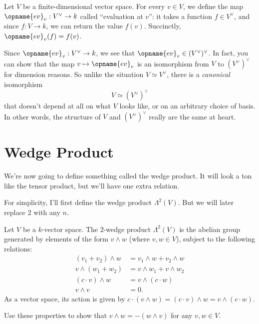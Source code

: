 \begin{itemize}
	Let $V$ be a finite-dimensional vector space.
	For every $v \in V$, we define the map $\opname{ev}_v : V^\vee \to k$
	called ``evaluation at $v$'': it takes a function $f \in V^\vee$,
	and since $f : V \to k$, we can return the value $f(v)$.
	Succinctly, $\opname{ev}_v(f) = f(v)$.

	Since $\opname{ev}_v : V^\vee \to k$, we see that
	$\opname{ev}_v \in (V^\vee)^\vee$.
	In fact, you can show that the map $v \mapsto \opname{ev}_v$
	is an isomorphism from $V$ to $(V^\vee)^\vee$ for dimension reasons.
	So unlike the situation $V \simeq V^\vee$, there
	is a \emph{canonical} isomorphism \[ V \simeq (V^\vee)^\vee \]
	that doesn't depend at all on what $V$ looks like,
	or on an arbitrary choice of basis.
	In other words, the structure of $V$ and $(V^\vee)^\vee$ really are the same at heart.
\end{itemize}



\section{Wedge Product}
We're now going to define something called the wedge product.
It will look a ton like the tensor product, but we'll have one extra relation.

For simplicity, I'll first define the wedge product $\Lambda^2(V)$.
But we will later replace $2$ with any $n$.

\begin{definition}
	Let $V$ be a $k$-vector space.
	The $2$-wedge product $\Lambda^2(V)$ is the abelian group
	generated by elements of the form $v \wedge w$ (where $v,w \in V$),
	subject to the following relations:
	\begin{align*}
		(v_1 + v_2) \wedge w &= v_1 \wedge w + v_2 \wedge w \\
		v \wedge (w_1 + w_2) &= v \wedge w_1 + v \wedge w_2 \\
		(c \cdot v) \wedge w &= v \wedge (c \cdot w) \\
		v \wedge v &= 0.
	\end{align*}
	As a vector space, its action is given by
	$c \cdot (v \wedge w) = (c \cdot v) \wedge w = v \wedge (c \cdot w)$.
\end{definition}
\begin{exercise}
	Use these properties to show that $v \wedge w = - (w \wedge v)$
	for any $v,w \in V$.
\end{exercise}

